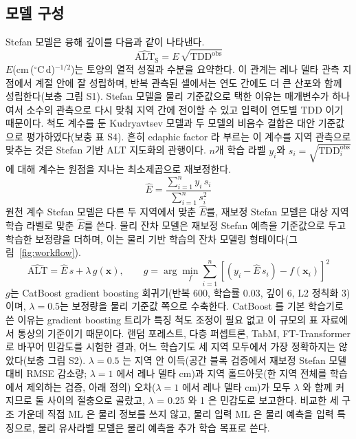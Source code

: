 \subsection{모델 구성}
Stefan 모델은 융해 깊이를 다음과 같이 나타낸다.
\begin{equation}
\widehat{\mathrm{ALT}}_{\mathrm{S}} = E\,\sqrt{\mathrm{TDD}^{\mathrm{obs}}}
\label{eq:stefan}
\end{equation}
$E$(cm\,($^\circ$C\,d)$^{-1/2}$)는 토양의 열적 성질과 수분을 요약한다\cite{Stefan1891,Riseborough2008}. 이 관계는 레나 델타 관측 지점에서 계절 안에 잘 성립하며, 반복 관측된 셀에서는 연도 간에도 더 큰 산포와 함께 성립한다(보충 그림 S1). Stefan 모델을 물리 기준값으로 택한 이유는 매개변수가 하나여서 소수의 관측으로 다시 맞춰 지역 간에 전이할 수 있고 입력이 연도별 TDD 이기 때문이다. 척도 계수를 둔 Kudryavtsev 모델\cite{Kudryavtsev1974,RomanovskyOsterkamp1997}과 두 모델의 비음수 결합은 대안 기준값으로 평가하였다(보충 표 S4). 흔히 edaphic factor 라 부르는 이 계수를 지역 관측으로 맞추는 것은 Stefan 기반 ALT 지도화의 관행이다\cite{Nelson1997,ShiklomanovNelson2002}. $n$개 학습 라벨 $y_i$와 $s_i = \sqrt{\mathrm{TDD}^{\mathrm{obs}}_i}$에 대해 계수는 원점을 지나는 최소제곱으로 재보정한다.
\begin{equation}
\hat{E} = \frac{\sum_{i=1}^{n} y_i\, s_i}{\sum_{i=1}^{n} s_i^{2}}
\label{eq:E}
\end{equation}
원천 계수 Stefan 모델은 다른 두 지역에서 맞춘 $\hat{E}$를, 재보정 Stefan 모델은 대상 지역 학습 라벨로 맞춘 $\hat{E}$를 쓴다. 물리 잔차 모델은 재보정 Stefan 예측을 기준값으로 두고 학습한 보정량을 더하며, 이는 물리 기반 학습의 잔차 모델링 형태이다\cite{Willard2022}(그림~\ref{fig:workflow}).
\begin{equation}
\widehat{\mathrm{ALT}} = \hat{E}\, s + \lambda\, g(\mathbf{x}), \qquad g = \arg\min_{f} \sum_{i=1}^{n} \left[ \left( y_i - \hat{E}\, s_i \right) - f(\mathbf{x}_i) \right]^{2}
\label{eq:residual}
\end{equation}
$g$는 CatBoost gradient boosting 회귀기\cite{Prokhorenkova2018}(반복 600, 학습률 0.03, 깊이 6, L2 정칙화 3)이며, $\lambda=0.5$는 보정량을 물리 기준값 쪽으로 수축한다. CatBoost 를 기본 학습기로 쓴 이유는 gradient boosting 트리가 특징 척도 조정이 필요 없고 이 규모의 표 자료에서 통상의 기준이기 때문이다\cite{Grinsztajn2022}. 랜덤 포레스트, 다층 퍼셉트론, TabM, FT-Transformer\cite{Gorishniy2021,Gorishniy2025,Holzmuller2024}로 바꾸어 민감도를 시험한 결과, 어느 학습기도 세 지역 모두에서 가장 정확하지는 않았다(보충 그림 S2). $\lambda=0.5$ 는 지역 안 이득(공간 블록 검증에서 재보정 Stefan 모델 대비 RMSE 감소량; $\lambda=1$ 에서 레나 델타 \ndlamOneLeblk{} cm)과 지역 홀드아웃(한 지역 전체를 학습에서 제외하는 검증, 아래 정의) 오차($\lambda=1$ 에서 레나 델타 \ndlamOneLereg{} cm)가 모두 $\lambda$ 와 함께 커지므로 둘 사이의 절충으로 골랐고, $\lambda$ = 0.25 와 1 은 민감도로 보고한다. 비교한 세 구조 가운데 직접 ML 은 물리 정보를 쓰지 않고, 물리 입력 ML 은 물리 예측을 입력 특징으로, 물리 유사라벨 모델은 물리 예측을 추가 학습 목표로 쓴다.
